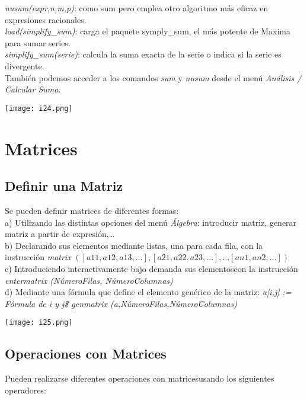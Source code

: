 \documentclass[12pt]{article}
\begin{document}
 \textit{nusum(expr,n,m,p)}: como sum pero emplea otro algoritmo más eficaz en expresiones racionales.\\
 
 \textit{load(simplify\_sum)}: carga el paquete symply\_sum, el más potente de Maxima para sumar series.\\
 
 \textit{simplify\_sum(serie)}: calcula la suma exacta de la serie o indica si la serie es divergente.\\
 
También podemos acceder a los comandos \textit{sum }y \textit{nusum} desde el menú \textit{Análisis / Calcular Suma}.

\begin{center}
   \texttt{[image: i24.png]}\\
\end{center}

\section*{Matrices}
\subsection*{Definir una Matriz}
Se pueden definir matrices de diferentes formas:\\

a) Utilizando las distintas opciones del menú \textit{Álgebra}: introducir matriz, generar
matriz a partir de expresión,…\\
b) Declarando sus elementos mediante listas, una para cada fila, con la instrucción
\textit{matrix} \textit{$([a11, a12, a13,...],[a21,a22,a23,...],...[an1,an2,...])$}\\
c) Introduciendo interactivamente bajo demanda sus elementoscon la instrucción
\textit{entermatrix (NúmeroFilas, NúmeroColumnas)}\\
d) Mediante una fórmula que define el elemento genérico de la matriz:
\textit{a[i,j] := Fórmula de i y j\$ genmatrix (a,NúmeroFilas,NúmeroColumnas)}

\begin{center}
   \texttt{[image: i25.png]}\\
\end{center}

\subsection*{Operaciones con Matrices}
Pueden realizarse diferentes operaciones con matricesusando los siguientes operadores:\\
\end{document}
